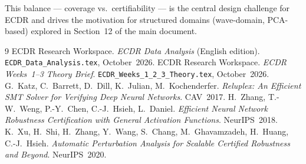 \documentclass[11pt, a4paper]{article}
\theoremstyle{definition}
\theoremstyle{plain}
\newcommand{\code}[1]{{\small\ttfamily\nolinkurl{#1}}}
\begin{document}
This balance — coverage vs.\ certifiability — is the central design challenge
for ECDR and drives the motivation for structured domains (wave-domain, PCA-based)
explored in Section~12 of the main document.

\begin{thebibliography}{9}
  ECDR Research Workspace. \textit{ECDR Data Analysis} (English edition).
  \code{ECDR_Data_Analysis.tex}, October~2026.
  ECDR Research Workspace. \textit{ECDR Weeks~1--3 Theory Brief}.
  \code{ECDR_Weeks_1_2_3_Theory.tex}, October~2026.
  G.~Katz, C.~Barrett, D.~Dill, K.~Julian, M.~Kochenderfer.
  \textit{Reluplex: An Efficient SMT Solver for Verifying Deep Neural Networks}.
  CAV~2017.
  H.~Zhang, T.-W.~Weng, P.-Y.~Chen, C.-J.~Hsieh, L.~Daniel.
  \textit{Efficient Neural Network Robustness Certification with General Activation Functions}.
  NeurIPS~2018.
  K.~Xu, H.~Shi, H.~Zhang, Y.~Wang, S.~Chang, M.~Ghavamzadeh, H.~Huang, C.-J.~Hsieh.
  \textit{Automatic Perturbation Analysis for Scalable Certified Robustness and Beyond}.
  NeurIPS~2020.
\end{thebibliography}
\end{document}
